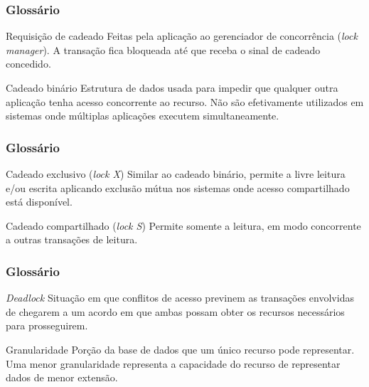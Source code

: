 \documentclass{beamer}
\begin{document}

\begin{frame} %
    \frametitle{Glossário}

    \begin{block}{Requisição de cadeado}
        Feitas pela aplicação ao gerenciador de concorrência (\emph{lock manager}). A transação fica bloqueada até que receba o sinal de cadeado concedido.
    \end{block}
    \begin{block}{Cadeado binário}
        Estrutura de dados usada para impedir que qualquer outra aplicação tenha acesso concorrente ao recurso. Não são efetivamente utilizados em sistemas onde múltiplas aplicações executem simultaneamente.
    \end{block}
\end{frame}


\begin{frame} %
    \frametitle{Glossário}

    \begin{block}{Cadeado exclusivo (\emph{lock X})}
        Similar ao cadeado binário, permite a livre leitura e/ou escrita aplicando exclusão mútua nos sistemas onde acesso compartilhado está disponível.
    \end{block}
    \begin{block}{Cadeado compartilhado (\emph{lock S})}
        Permite somente a leitura, em modo concorrente a outras transações de leitura.
    \end{block}
\end{frame}


\begin{frame} %
    \frametitle{Glossário}

    \begin{block}{\emph{Deadlock}}
        Situação em que conflitos de acesso previnem as transações envolvidas de chegarem a um acordo em que ambas possam obter os recursos necessários para prosseguirem.
    \end{block}
    \begin{block}{Granularidade}
        Porção da base de dados que um único recurso pode representar. Uma menor granularidade representa a capacidade do recurso de representar dados de menor extensão.
    \end{block}
\end{frame}
\end{document}
